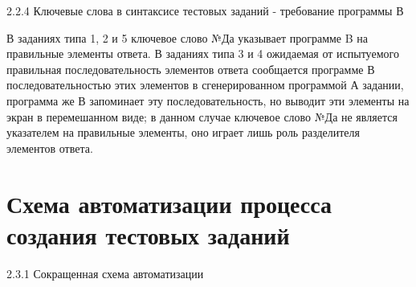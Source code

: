 %
%
%
%
%
%
%
%
%
%
%

2.2.4 Ключевые слова в синтаксисе тестовых заданий - требование программы В

В заданиях типа 1, 2 и 5 ключевое слово №Да указывает программе \foreignlanguage{english}{B} на правильные элементы
ответа. В заданиях типа 3 и 4 ожидаемая от испытуемого правильная последовательность элементов ответа сообщается
программе В последовательностью этих элементов в сгенерированном программой А задании, программа же В запоминает эту
последовательность, но выводит эти элементы на экран в перемешанном виде; в данном случае ключевое слово №Да не
является указателем на правильные элементы, оно играет лишь роль разделителя элементов ответа.

\section{Схема автоматизации процесса создания тестовых заданий}\label{AKM_ch2_3}
\hypertarget{Toc503377133}{}2.3.1 Сокращенная схема автоматизации

